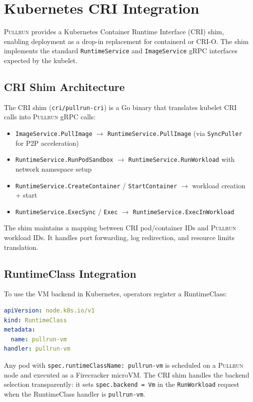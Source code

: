 \documentclass[11pt,a4paper]{article}
\newcommand{\pullrun}{\textsc{Pullrun}}
\begin{document}
\section{Kubernetes CRI Integration}\label{sec:cri}

\pullrun{} provides a Kubernetes Container Runtime Interface (CRI) shim, enabling deployment as a drop-in replacement for containerd or CRI-O. The shim implements the standard \texttt{RuntimeService} and \texttt{ImageService} gRPC interfaces expected by the kubelet.

\subsection{CRI Shim Architecture}

The CRI shim (\texttt{cri/pullrun-cri}) is a Go binary that translates kubelet CRI calls into \pullrun{} gRPC calls:

\begin{itemize}[leftmargin=*]
    \item \texttt{ImageService.PullImage} $\rightarrow$ \texttt{RuntimeService.PullImage} (via \texttt{SyncPuller} for P2P acceleration)
    \item \texttt{RuntimeService.RunPodSandbox} $\rightarrow$ \texttt{RuntimeService.RunWorkload} with network namespace setup
    \item \texttt{RuntimeService.CreateContainer} / \texttt{StartContainer} $\rightarrow$ workload creation + start
    \item \texttt{RuntimeService.ExecSync} / \texttt{Exec} $\rightarrow$ \texttt{RuntimeService.ExecInWorkload}
\end{itemize}

The shim maintains a mapping between CRI pod/container IDs and \pullrun{} workload IDs. It handles port forwarding, log redirection, and resource limits translation.

\subsection{RuntimeClass Integration}

To use the VM backend in Kubernetes, operators register a RuntimeClass:

\begin{lstlisting}[language=YAML]
apiVersion: node.k8s.io/v1
kind: RuntimeClass
metadata:
  name: pullrun-vm
handler: pullrun-vm
\end{lstlisting}

Any pod with \texttt{spec.runtimeClassName: pullrun-vm} is scheduled on a \pullrun{} node and executed as a Firecracker microVM. The CRI shim handles the backend selection transparently: it sets \texttt{spec.backend = Vm} in the \texttt{RunWorkload} request when the RuntimeClass handler is \texttt{pullrun-vm}.
\end{document}
